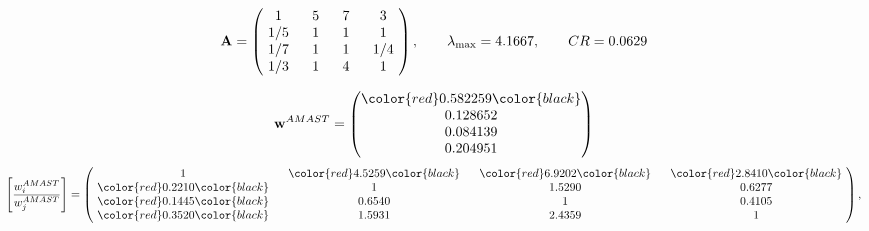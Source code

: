 \begin{example}
\begin{equation*}
\mathbf{A} =
\begin{pmatrix}
$\,\,$ 1 $\,\,$ & $\,\,$5$\,\,$ & $\,\,$7$\,\,$ & $\,\,$3 $\,\,$ \\
$\,\,$ 1/5$\,\,$ & $\,\,$ 1 $\,\,$ & $\,\,$1$\,\,$ & $\,\,$1 $\,\,$ \\
$\,\,$ 1/7$\,\,$ & $\,\,$ 1 $\,\,$ & $\,\,$ 1 $\,\,$ & $\,\,$ 1/4 $\,\,$ \\
$\,\,$ 1/3$\,\,$ & $\,\,$ 1 $\,\,$ & $\,\,$4$\,\,$ & $\,\,$ 1  $\,\,$ \\
\end{pmatrix},
\qquad
\lambda_{\max} =
4.1667,
\qquad
CR = 0.0629
\end{equation*}

\begin{equation*}
\mathbf{w}^{AMAST} =
\begin{pmatrix}
\color{red} 0.582259\color{black} \\
0.128652\\
0.084139\\
0.204951
\end{pmatrix}\end{equation*}
\begin{equation*}
\left[ \frac{{w}^{AMAST}_i}{{w}^{AMAST}_j} \right] =
\begin{pmatrix}
$\,\,$ 1 $\,\,$ & $\,\,$\color{red} 4.5259\color{black} $\,\,$ & $\,\,$\color{red} 6.9202\color{black} $\,\,$ & $\,\,$\color{red} 2.8410\color{black} $\,\,$ \\
$\,\,$\color{red} 0.2210\color{black} $\,\,$ & $\,\,$ 1 $\,\,$ & $\,\,$1.5290$\,\,$ & $\,\,$0.6277  $\,\,$ \\
$\,\,$\color{red} 0.1445\color{black} $\,\,$ & $\,\,$0.6540$\,\,$ & $\,\,$ 1 $\,\,$ & $\,\,$0.4105 $\,\,$ \\
$\,\,$\color{red} 0.3520\color{black} $\,\,$ & $\,\,$1.5931$\,\,$ & $\,\,$2.4359$\,\,$ & $\,\,$ 1  $\,\,$ \\
\end{pmatrix},
\end{equation*}


\end{example}
